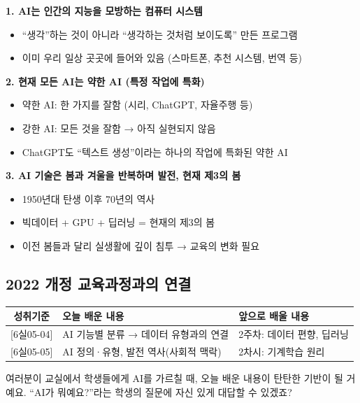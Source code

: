 \documentclass[11pt,a4paper]{article}
\begin{document}
\begin{summarybox}
\textbf{1. AI는 인간의 지능을 모방하는 컴퓨터 시스템}
\begin{itemize}[leftmargin=1em]
\item ``생각''하는 것이 아니라 ``생각하는 것처럼 보이도록'' 만든 프로그램
\item 이미 우리 일상 곳곳에 들어와 있음 (스마트폰, 추천 시스템, 번역 등)
\end{itemize}

\textbf{2. 현재 모든 AI는 약한 AI (특정 작업에 특화)}
\begin{itemize}[leftmargin=1em]
\item 약한 AI: 한 가지를 잘함 (시리, ChatGPT, 자율주행 등)
\item 강한 AI: 모든 것을 잘함 → 아직 실현되지 않음
\item ChatGPT도 ``텍스트 생성''이라는 하나의 작업에 특화된 약한 AI
\end{itemize}

\textbf{3. AI 기술은 봄과 겨울을 반복하며 발전, 현재 제3의 봄}
\begin{itemize}[leftmargin=1em]
\item 1950년대 탄생 이후 70년의 역사
\item 빅데이터 + GPU + 딥러닝 = 현재의 제3의 봄
\item 이전 봄들과 달리 실생활에 깊이 침투 → 교육의 변화 필요
\end{itemize}
\end{summarybox}

\subsection{2022 개정 교육과정과의 연결}

\begin{center}
\begin{tabular}{|c|p{4.5cm}|p{5.5cm}|}
\hline
\rowcolor{tableheader}
\textbf{성취기준} & \textbf{오늘 배운 내용} & \textbf{앞으로 배울 내용} \\
\hline
{[6실05-04]} & AI 기능별 분류 → 데이터 유형과의 연결 & 2주차: 데이터 편향, 딥러닝 \\
\hline
{[6실05-05]} & AI 정의·유형, 발전 역사(사회적 맥락) & 2차시: 기계학습 원리 \\
\hline
\end{tabular}
\end{center}

 여러분이 교실에서 학생들에게 AI를 가르칠 때, 오늘 배운 내용이 탄탄한 기반이 될 거예요. ``AI가 뭐예요?''라는 학생의 질문에 자신 있게 대답할 수 있겠죠?
\end{document}
